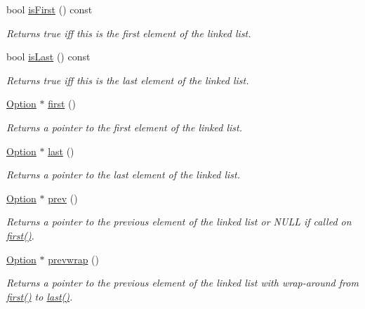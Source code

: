 \begin{DoxyCompactItemize}
bool \hyperlink{classoption_1_1Option_af51f53a553ef46110e36008a58466a2e}{is\+First} () const
\begin{DoxyCompactList}\small\item\em Returns true iff this is the first element of the linked list. \end{DoxyCompactList}\item 
bool \hyperlink{classoption_1_1Option_a36fa8fde6fce89462ded79ab56180ff7}{is\+Last} () const
\begin{DoxyCompactList}\small\item\em Returns true iff this is the last element of the linked list. \end{DoxyCompactList}\item 
\hyperlink{classoption_1_1Option}{Option} $\ast$ \hyperlink{classoption_1_1Option_abb4e13cd7c90999c8a6b1f871cece283}{first} ()
\begin{DoxyCompactList}\small\item\em Returns a pointer to the first element of the linked list. \end{DoxyCompactList}\item 
\hyperlink{classoption_1_1Option}{Option} $\ast$ \hyperlink{classoption_1_1Option_afe2aff68191e55b59c53fac3dbbcd7c3}{last} ()
\begin{DoxyCompactList}\small\item\em Returns a pointer to the last element of the linked list. \end{DoxyCompactList}\item 
\hyperlink{classoption_1_1Option}{Option} $\ast$ \hyperlink{classoption_1_1Option_a4d12001a91b0b35cf47437d0c60d2b52}{prev} ()
\begin{DoxyCompactList}\small\item\em Returns a pointer to the previous element of the linked list or N\+U\+LL if called on \hyperlink{classoption_1_1Option_abb4e13cd7c90999c8a6b1f871cece283}{first()}. \end{DoxyCompactList}\item 
\hyperlink{classoption_1_1Option}{Option} $\ast$ \hyperlink{classoption_1_1Option_a1226e45dc2de30f269b2aff1784bbee7}{prevwrap} ()
\begin{DoxyCompactList}\small\item\em Returns a pointer to the previous element of the linked list with wrap-\/around from \hyperlink{classoption_1_1Option_abb4e13cd7c90999c8a6b1f871cece283}{first()} to \hyperlink{classoption_1_1Option_afe2aff68191e55b59c53fac3dbbcd7c3}{last()}. \end{DoxyCompactList}\item 

\end{DoxyCompactItemize}
